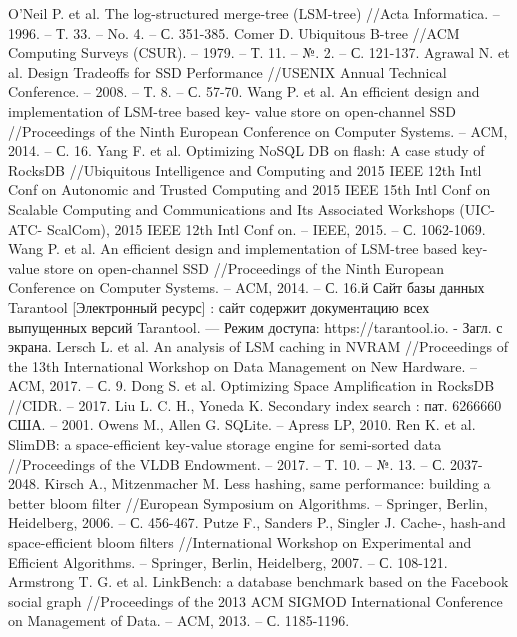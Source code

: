 \documentclass[a4paper,hidelinks,12pt]{article}
\begin{document}
\begin{thebibliography}{9}

 O’Neil P. et al. The log-structured merge-tree (LSM-tree) //Acta Informatica. – 1996. – Т. 33. – No. 4. – С. 351-385.
 Comer D. Ubiquitous B-tree //ACM Computing Surveys (CSUR). – 1979. – Т. 11. – №. 2. – С. 121-137.
 Agrawal N. et al. Design Tradeoffs for SSD Performance //USENIX Annual Technical Conference. – 2008. – Т. 8. – С. 57-70.
 Wang P. et al. An efficient design and implementation of LSM-tree based key- value store on open-channel SSD //Proceedings of the Ninth European Conference on Computer Systems. – ACM, 2014. – С. 16.
 Yang F. et al. Optimizing NoSQL DB on flash: A case study of RocksDB //Ubiquitous Intelligence and Computing and 2015 IEEE 12th Intl Conf on Autonomic and Trusted Computing and 2015 IEEE 15th Intl Conf on Scalable Computing and Communications and Its Associated Workshops (UIC-ATC- ScalCom), 2015 IEEE 12th Intl Conf on. – IEEE, 2015. – С. 1062-1069.
 Wang P. et al. An efficient design and implementation of LSM-tree based key- value store on open-channel SSD //Proceedings of the Ninth European Conference on Computer Systems. – ACM, 2014. – С. 16.й
 Сайт базы данных Tarantool [Электронный ресурс] : сайт содержит документацию всех выпущенных версий Tarantool. — Режим доступа: https://tarantool.io. - Загл. с экрана.
 Lersch L. et al. An analysis of LSM caching in NVRAM //Proceedings of the 13th International Workshop on Data Management on New Hardware. – ACM, 2017. – С. 9.
 Dong S. et al. Optimizing Space Amplification in RocksDB //CIDR. – 2017.
 Liu L. C. H., Yoneda K. Secondary index search : пат. 6266660 США. – 2001.
 Owens M., Allen G. SQLite. – Apress LP, 2010.
 Ren K. et al. SlimDB: a space-efficient key-value storage engine for semi-sorted data //Proceedings of the VLDB Endowment. – 2017. – Т. 10. – №. 13. – С. 2037-2048.
 Kirsch A., Mitzenmacher M. Less hashing, same performance: building a better bloom filter //European Symposium on Algorithms. – Springer, Berlin, Heidelberg, 2006. – С. 456-467.
 Putze F., Sanders P., Singler J. Cache-, hash-and space-efficient bloom filters //International Workshop on Experimental and Efficient Algorithms. – Springer, Berlin, Heidelberg, 2007. – С. 108-121.
 Armstrong T. G. et al. LinkBench: a database benchmark based on the Facebook social graph //Proceedings of the 2013 ACM SIGMOD International Conference on Management of Data. – ACM, 2013. – С. 1185-1196.

\end{thebibliography}
\end{document}
